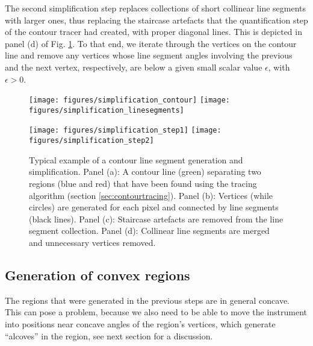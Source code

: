 The second simplification step replaces collections of short collinear line segments with larger ones,
thus replacing the staircase artefacts that the quantification step of the contour tracer had created,
with proper diagonal lines. This is depicted in panel (d) of Fig. \ref{fig:contour_simplification}.
To that end, we iterate through the vertices on the contour line and remove any vertices whose line segment angles
involving the previous and the next vertex, respectively, are below a given small scalar value $\epsilon$, with $\epsilon > 0$.


\begin{figure}
	\texttt{[image: figures/simplification\_contour]}
	\hspace{0.1cm}
	\texttt{[image: figures/simplification\_linesegments]}

	\vspace{0.25cm}

	\texttt{[image: figures/simplification\_step1]}
	\hspace{0.1cm}
	\texttt{[image: figures/simplification\_step2]}
	\caption[Contour line segment generation.]{
		Typical example of a contour line segment generation and simplification.
		Panel (a): A contour line (green) separating two regions (blue and red) that have been found using 
			the tracing algorithm (section \ref{sec:contourtracing}).
		Panel (b): Vertices (while circles) are generated for each pixel and connected by line 
			segments (black lines).
		Panel (c): Staircase artefacts are removed from the line segment collection.
		Panel (d): Collinear line segments are merged and unnecessary vertices removed.
		\label{fig:contour_simplification}}
\end{figure}



\subsection{Generation of convex regions}
\label{sec:convex_regions}
The regions that were generated in the previous steps are in general concave. 
This can pose a problem, because we also need to be able to move the instrument into positions near concave angles
of the region's vertices, which generate ``alcoves'' in the region, see next section for a discussion.

